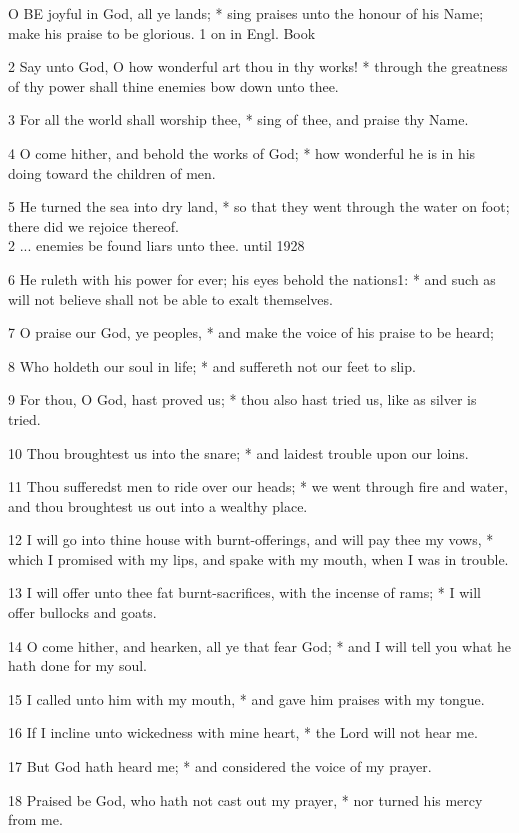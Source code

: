 O
BE joyful in God, all ye lands; * sing praises unto the honour of his
Name; make his praise to be glorious. 1
on in
Engl. Book

2 Say unto God, O how wonderful art thou in thy works! * through the greatness
of thy power shall thine enemies bow down unto thee.

3 For all the world shall worship thee, * sing of thee,
and praise thy Name.

4 O come hither, and behold the works of God; * how wonderful
he is in his doing toward the children of men.

5 He turned the sea into dry land, * so that they went
through the water on foot; there did we rejoice thereof. \\
2 ... enemies be found liars
unto thee.
until 1928

6 He ruleth with his power for ever; his eyes behold the nations1:
* and such as will not believe shall not be able to exalt themselves.

7 O praise our God, ye peoples, * and make the voice
of his praise to be heard;

8 Who holdeth our soul in life; * and suffereth not
our feet to slip.

9 For thou, O God, hast proved us; * thou also hast
tried us, like as silver is tried.

10 Thou broughtest us into the snare; * and laidest
trouble upon our loins.

11 Thou sufferedst men to ride over our heads; * we
went through fire and water, and thou broughtest us out into a wealthy
place.

12 I will go into thine house with burnt-offerings,
and will pay thee my vows, * which I promised with my lips, and spake
with my mouth, when I was in trouble.

13 I will offer unto thee fat burnt-sacrifices, with
the incense of rams; * I will offer bullocks and goats.

14 O come hither, and hearken, all ye that fear God;
* and I will tell you what he hath done for my soul.

15 I called unto him with my mouth, * and gave him
praises with my tongue.

16 If I incline unto wickedness with mine heart, *
the Lord will not hear me.

17 But God hath heard me; * and considered the voice
of my prayer.

18 Praised be God, who hath not cast out my prayer,
* nor turned his mercy from me.

